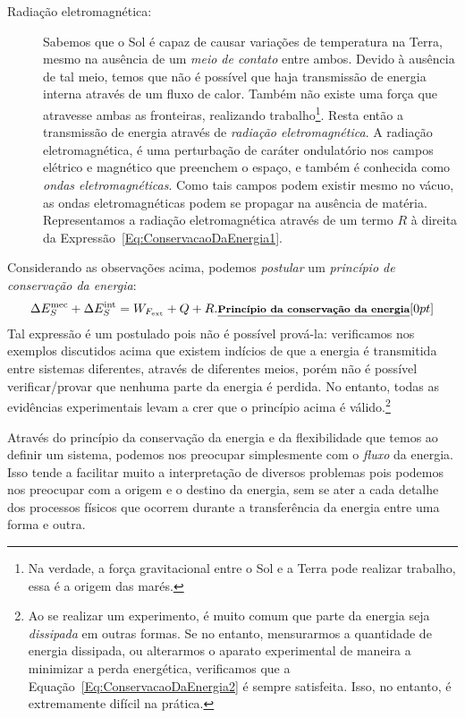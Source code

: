 \begin{description}
    \item[Radiação eletromagnética:] Sabemos que o Sol é capaz de causar variações de temperatura na Terra, mesmo na ausência de um \emph{meio de contato} entre ambos. Devido à ausência de tal meio, temos que não é possível que haja transmissão de energia interna através de um fluxo de calor. Também não existe uma força que atravesse ambas as fronteiras, realizando trabalho\footnote{Na verdade, a força gravitacional entre o Sol e a Terra pode realizar trabalho, essa é a origem das marés.}. Resta então a transmissão de energia através de \emph{radiação eletromagnética}. A radiação eletromagnética, é uma perturbação de caráter ondulatório nos campos elétrico e magnético que preenchem o espaço, e também é conhecida como \emph{ondas eletromagnéticas}. Como tais campos podem existir mesmo no vácuo, as ondas eletromagnéticas podem se propagar na ausência de matéria. Representamos a radiação eletromagnética através de um termo $R$ à direita da Expressão~\eqref{Eq:ConservacaoDaEnergia1}.
\end{description}
 
Considerando as observações acima, podemos \emph{postular} um \emph{princípio de conservação da energia}:
\begin{equation}\label{Eq:ConservacaoDaEnergia2}
    \Delta E_S^{\textrm{mec}} + \Delta E_S^{\textrm{int}} = W_{F_{\textrm{ext}}} + Q + R. \relax{\footnotesize\emph{\textbf{Princípio da conservação da energia}}}[0pt]
\end{equation}
%
Tal expressão é um postulado pois não é possível prová-la: verificamos nos exemplos discutidos acima que existem indícios de que a energia é transmitida entre sistemas diferentes, através de diferentes meios, porém não é possível verificar/provar que nenhuma parte da energia é perdida. No entanto, todas as evidências experimentais levam a crer que o princípio acima é válido.\footnote{Ao se realizar um experimento, é muito comum que parte da energia seja \emph{dissipada} em outras formas. Se no entanto, mensurarmos a quantidade de energia dissipada, ou alterarmos o aparato experimental de maneira a minimizar a perda energética, verificamos que a Equação~\eqref{Eq:ConservacaoDaEnergia2} é sempre satisfeita. Isso, no entanto, é extremamente difícil na prática.}

Através do princípio da conservação da energia e da flexibilidade que temos ao definir um sistema, podemos nos preocupar simplesmente com o \emph{fluxo} da energia. Isso tende a facilitar muito a interpretação de diversos problemas pois podemos nos preocupar com a origem e o destino da energia, sem se ater a cada detalhe dos processos físicos que ocorrem durante a transferência da energia entre uma forma e outra.
 

